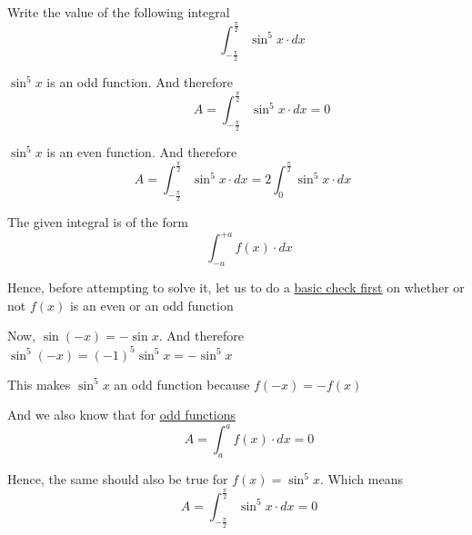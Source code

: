 \documentclass[14pt,fleqn]{extarticle}
\begin{document}
\newcommand\fx{\sin^5 x}
\newcommand\intg{\int_{-\frac{\pi}{2}}^{\frac{\pi}{2}}}
Write the value of the following integral
\[\qquad\qquad \int_{-\frac\pi{2}}^{\frac\pi{2}}\sin^5 x\cdot dx\]
%
\newcard 

$\fx$ is an odd function. And therefore 
\[ \qquad\qquad A = \intg \fx\cdot dx = 0 \]

\newcard 

$\fx$ is an even function. And therefore 
\[ \quad A = \intg \fx\cdot dx = 2\int_0^{\frac\pi{2}} \fx\cdot dx  \]

\newcard

The given integral is of the form \[\qquad \int_{-a}^{+a} f(x)\cdot dx\]

Hence, before attempting to solve it, let us to do a \underline{basic check first} on
whether or not $f(x)$ is an even or an odd function \newline 

Now, $\sin \left(-x \right) = -\sin x$. And therefore 
$\sin^5 \left(-x \right) = (-1)^5\sin^5 x = -\sin^5 x$\newline 

This makes $\sin^5 x$ an odd function because $f(-x) = -f(x)$ \newline 

And we also know that for \underline{odd functions}
\[ \qquad A = \int_a^a f(x)\cdot dx = 0 \]

Hence, the same should also be true for $f(x) = \sin^5 x$. Which means 
\[ \qquad A = \intg \fx\cdot dx = 0 \] 
\end{document}

